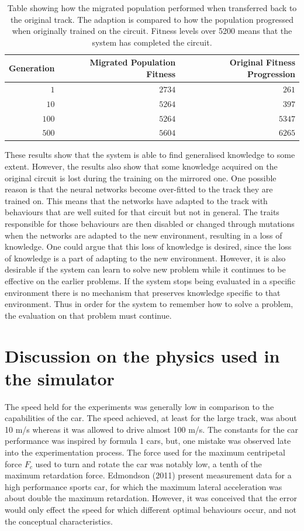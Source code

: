 \begin{table}[H] 
  \centering
  \begin{tabular}{rrr}
    \toprule
    Generation & Migrated Population Fitness & Original Fitness Progression\\
    \midrule
    $1$     & $2734$ & $261$    \\
    $10$    & $5264$ & $397$    \\
    $100$   & $5264$ & $5347$   \\
    $500$   & $5604$ & $6265$   \\
    \bottomrule
  \end{tabular}
  \caption{Table showing how the migrated population performed when transferred back to the original track. The adaption is compared to how the population progressed when originally trained on the circuit. Fitness levels over 5200 means that the system has completed the circuit.}
  \label{tab:mirrored_back}
\end{table}

These results show that the system is able to find generalised knowledge to some extent. However, the results also show that some knowledge acquired on the original circuit is lost during the training on the mirrored one. One possible reason is that the neural networks become over-fitted to the track they are trained on. This means that the networks have adapted to the track with behaviours that are well suited for that circuit but not in general. The traits responsible for those behaviours are then disabled or changed through mutations when the networks are adapted to the new environment, resulting in a loss of knowledge. One could argue that this loss of knowledge is desired, since the loss of knowledge is a part of adapting to the new environment. However, it is also desirable if the system can learn to solve new problem while it continues to be effective on the earlier problems. If the system stops being evaluated in a specific environment there is no mechanism that preserves knowledge specific to that environment. Thus in order for the system to remember how to solve a problem, the evaluation on that problem must continue. 


\section{Discussion on the physics used in the simulator}
The speed held for the experiments was generally low in comparison to the capabilities of the car. The speed achieved, at least for the large track, was about 10 m/s whereas it was allowed to drive almost 100 m/s. The constants for the car performance was inspired by formula 1 cars, but, one mistake was observed late into the experimentation process. The force used for the maximum centripetal force $F_c$ used to turn and rotate the car was notably low, a tenth of the maximum retardation force. Edmondson (2011) present measurement data for a high performance sports car, for which the maximum lateral acceleration was about double the maximum retardation. However, it was conceived that the error would only effect the speed for which different optimal behaviours occur, and not the conceptual characteristics.

